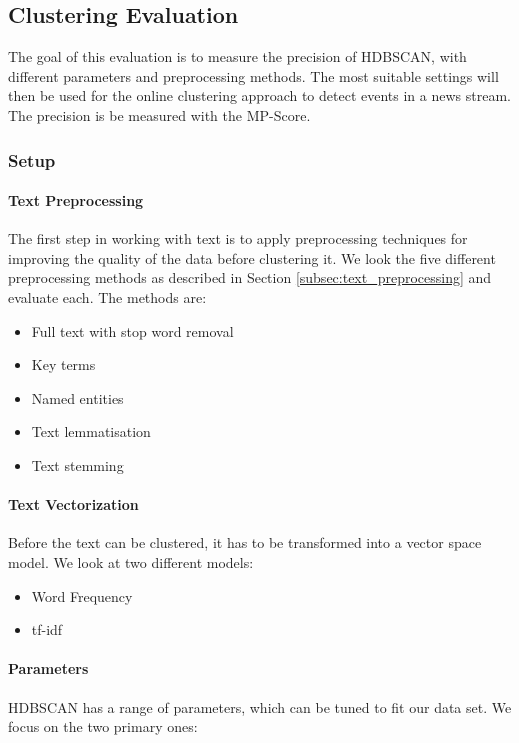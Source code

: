 \subsection{Clustering Evaluation}
\label{sec:clustering_evaluation}

The goal of this evaluation is to measure the precision of HDBSCAN, with different parameters and preprocessing methods.
The most suitable settings will then be used for the online clustering approach to detect events in a news stream.
The precision is be measured with the MP-Score.

\subsubsection{Setup}

\paragraph{Text Preprocessing}

The first step in working with text is to apply preprocessing techniques for improving the quality of the data before clustering it.
We look the five different preprocessing methods as described in Section \ref{subsec:text_preprocessing} and evaluate each.
The methods are:

\begin{itemize}
    \item Full text with stop word removal
    \item Key terms
    \item Named entities
    \item Text lemmatisation
    \item Text stemming
\end{itemize}

\paragraph{Text Vectorization} Before the text can be clustered, it has to be transformed into a vector space model.
We look at two different models:

\begin{itemize}
    \item Word Frequency
    \item tf-idf
\end{itemize}

\paragraph{Parameters} HDBSCAN has a range of parameters, which can be tuned to fit our data set.
We focus on the two primary ones:

